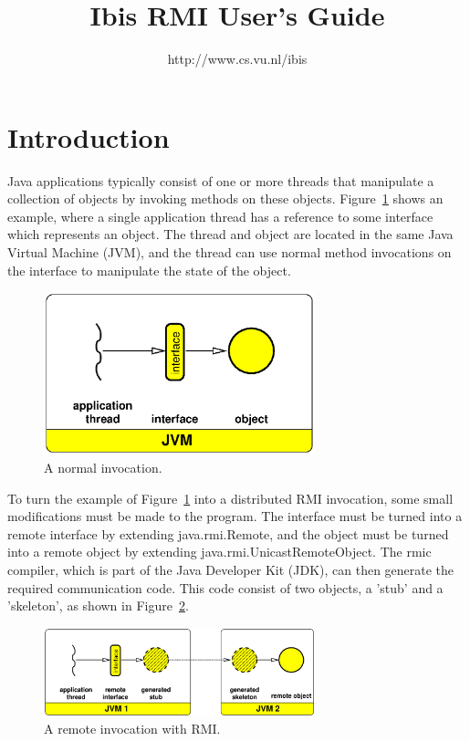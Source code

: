 \documentclass[a4paper,10pt]{article}
\begin{document}
\title{Ibis RMI User's Guide}

\author{http://www.cs.vu.nl/ibis}

\maketitle

\section{Introduction}

Java applications typically consist of one or more threads that
manipulate a collection of objects by invoking methods on these
objects. Figure~\ref{normal-fig} shows an example, where a single
application thread
has a reference to some interface which represents an object. The
thread and object are located in the same Java Virtual Machine (JVM),
and the thread can use normal method invocations on the interface to
manipulate the state of the object.

\begin{figure}[t]
\begin{center}
\includegraphics[width=0.7\textwidth]{normal.eps}
\end{center}
\caption{A normal invocation.}
\label{normal-fig}
\end{figure}

To turn the example of Figure~\ref{normal-fig} into a distributed RMI invocation,
some small modifications must be made to the program. The interface
must be turned into a remote interface by extending java.rmi.Remote,
and the object must be turned into a remote object by extending
java.rmi.UnicastRemoteObject. The rmic compiler, which is part of the
Java Developer Kit (JDK), can then generate the required communication
code. This code consist of two objects, a 'stub' and a 'skeleton', as
shown in Figure~\ref{rmi-fig}.

\begin{figure}[t]
\begin{center}
\includegraphics[width=0.7\textwidth]{rmi-abstract.eps}
\end{center}
\caption{A remote invocation with RMI.}
\label{rmi-fig}
\end{figure}
\end{document}
